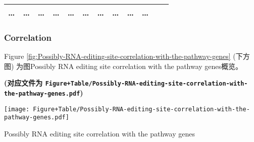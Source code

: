 \documentclass[
]{article}
\begin{document}
\begin{longtable}[]{@{}llllllllllll@{}}
\begin{minipage}[t]{0.06\columnwidth}
\ldots{}\strut
\end{minipage} & \begin{minipage}[t]{0.06\columnwidth}\raggedright
\ldots{}\strut
\end{minipage} & \begin{minipage}[t]{0.06\columnwidth}\raggedright
\ldots{}\strut
\end{minipage} & \begin{minipage}[t]{0.06\columnwidth}\raggedright
\ldots{}\strut
\end{minipage} & \begin{minipage}[t]{0.06\columnwidth}\raggedright
\ldots{}\strut
\end{minipage} & \begin{minipage}[t]{0.08\columnwidth}\raggedright
\ldots{}\strut
\end{minipage} & \begin{minipage}[t]{0.06\columnwidth}\raggedright
\ldots{}\strut
\end{minipage} & \begin{minipage}[t]{0.06\columnwidth}\raggedright
\ldots{}\strut
\end{minipage} & \begin{minipage}[t]{0.09\columnwidth}\raggedright
\ldots{}\strut
\end{minipage} & \begin{minipage}[t]{0.02\columnwidth}\raggedright
\ldots{}\strut
\end{minipage}\tabularnewline
\bottomrule
\end{longtable}

\hypertarget{correlation}{%
\subsubsection{Correlation}\label{correlation}}

Figure \ref{fig:Possibly-RNA-editing-site-correlation-with-the-pathway-genes} (下方图) 为图Possibly RNA editing site correlation with the pathway genes概览。

\textbf{(对应文件为 \texttt{Figure+Table/Possibly-RNA-editing-site-correlation-with-the-pathway-genes.pdf})}

\def\@captype{figure}
\begin{center}
\texttt{[image: Figure+Table/Possibly-RNA-editing-site-correlation-with-the-pathway-genes.pdf]}
\caption{Possibly RNA editing site correlation with the pathway genes}\label{fig:Possibly-RNA-editing-site-correlation-with-the-pathway-genes}
\end{center}
\end{document}
